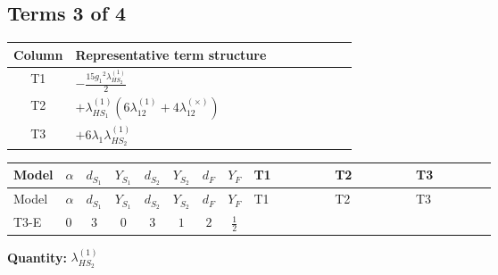 \documentclass[8pt]{article}
\begin{document}
\begin{landscape}
\subsection*{Terms 3 of 4}
\begin{center}
\begin{tabular}{@{}c >{\raggedright\arraybackslash}p{0.82\linewidth}@{}}
\toprule
Column & Representative term structure \\
\midrule
T1 & \(\displaystyle -\frac{15 {g_1}^2 {\lambda_{HS_2}^{(1)}}}{2}\) \\
\midrule
T2 & \(\displaystyle +{\lambda_{HS_1}^{(1)}} (6 {\lambda_{12}^{(1)}}+4 {\lambda_{12}^{(\times)}})\) \\
\midrule
T3 & \(\displaystyle +6 {\lambda_1} {\lambda_{HS_2}^{(1)}}\) \\
\midrule
\bottomrule
\end{tabular}
\end{center}
\smallskip
\tiny
\begin{longtable}{@{}llcccccc >{\raggedright\arraybackslash}p{0.21\linewidth} >{\raggedright\arraybackslash}p{0.21\linewidth} >{\raggedright\arraybackslash}p{0.21\linewidth}@{}}
\toprule
Model & $\alpha$ & $d_{S_1}$ & $Y_{S_1}$ & $d_{S_2}$ & $Y_{S_2}$ & $d_F$ & $Y_F$ & T1 & T2 & T3 \\
\midrule
\endfirsthead
\toprule
Model & $\alpha$ & $d_{S_1}$ & $Y_{S_1}$ & $d_{S_2}$ & $Y_{S_2}$ & $d_F$ & $Y_F$ & T1 & T2 & T3 \\
\midrule
\endhead
T3-E & $0$ & $3$ & $0$ & $3$ & $1$ & $2$ & $\frac{1}{2}$ & \scriptsize\adjustbox{max width=\linewidth}{$\begin{gathered} -\frac{15 {g_1}^2 {\lambda_{HS_2}^{(1)}}}{2}\end{gathered}$} & \scriptsize\adjustbox{max width=\linewidth}{$\begin{gathered} +{\lambda_{HS_1}^{(1)}} (6 {\lambda_{12}^{(1)}}+4 {\lambda_{12}^{(\times)}})\end{gathered}$} & \scriptsize\adjustbox{max width=\linewidth}{$\begin{gathered} +6 {\lambda_1} {\lambda_{HS_2}^{(1)}}\end{gathered}$} \\
\midrule
\bottomrule
\end{longtable}
\clearpage
\noindent\textbf{Quantity: }$\lambda_{HS_2}^{(1)}$\par\smallskip

\end{landscape}
\end{document}
